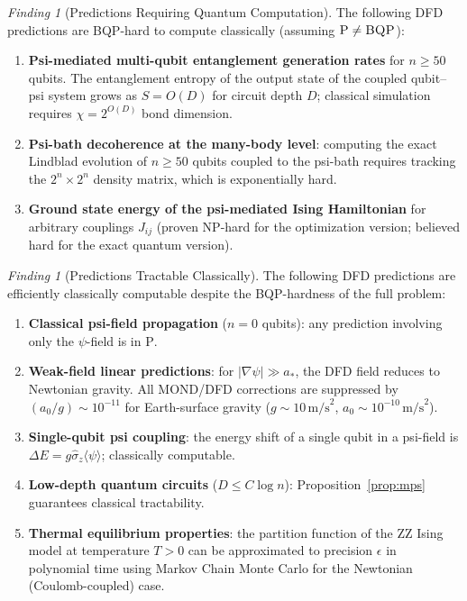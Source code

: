 \documentclass[11pt]{article}
\theoremstyle{definition}
\theoremstyle{remark}
\newtheorem{finding}[theorem]{Finding}
\newcommand{\astar}{a_*}
\newcommand{\BQP}{\textsc{BQP}}
\newcommand{\PP}{\textsc{P}}
\begin{document}
\begin{finding}[Predictions Requiring Quantum Computation]
\label{find:quantum_predictions}
The following DFD predictions are BQP-hard to compute classically
(assuming $\PP \neq \BQP$):
\begin{enumerate}
\item \textbf{Psi-mediated multi-qubit entanglement generation rates}
  for $n \geq 50$ qubits. The entanglement entropy of the output state
  of the coupled qubit--psi system grows as $S = O(D)$ for circuit depth
  $D$; classical simulation requires $\chi = 2^{O(D)}$ bond dimension.

\item \textbf{Psi-bath decoherence at the many-body level}: computing
  the exact Lindblad evolution of $n \geq 50$ qubits coupled to the
  psi-bath requires tracking the $2^n \times 2^n$ density matrix, which
  is exponentially hard.

\item \textbf{Ground state energy of the psi-mediated Ising Hamiltonian}
  for arbitrary couplings $J_{ij}$ (proven NP-hard for the optimization
  version; believed hard for the exact quantum version).
\end{enumerate}
\end{finding}

\begin{finding}[Predictions Tractable Classically]
\label{find:classical_predictions}
The following DFD predictions are efficiently classically computable
despite the BQP-hardness of the full problem:
\begin{enumerate}
\item \textbf{Classical psi-field propagation} ($n = 0$ qubits):
  any prediction involving only the $\psi$-field is in \PP.

\item \textbf{Weak-field linear predictions}: for $|\nabla\psi| \gg \astar$,
  the DFD field reduces to Newtonian gravity. All MOND/DFD corrections
  are suppressed by $(a_0/g) \sim 10^{-11}$ for Earth-surface gravity
  ($g \sim 10\,\mathrm{m/s}^2$, $a_0 \sim 10^{-10}\,\mathrm{m/s}^2$).

\item \textbf{Single-qubit psi coupling}: the energy shift of a single
  qubit in a psi-field is $\Delta E = g\hat{\sigma}_z \langle\psi\rangle$;
  classically computable.

\item \textbf{Low-depth quantum circuits} ($D \leq C\log n$):
  Proposition~\ref{prop:mps} guarantees classical tractability.

\item \textbf{Thermal equilibrium properties}: the partition function
  of the ZZ Ising model at temperature $T > 0$ can be approximated
  to precision $\epsilon$ in polynomial time using Markov Chain Monte
  Carlo for the Newtonian (Coulomb-coupled) case.
\end{enumerate}
\end{finding}
\end{document}
